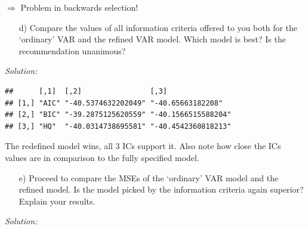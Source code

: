 \documentclass[12pt,a4paper]{article}
\newenvironment{Shaded}{\begin{snugshade}}{\end{snugshade}}
\newcommand{\CommentTok}[1]{\textcolor[rgb]{0.56,0.35,0.01}{\textit{#1}}}
\newcommand{\FloatTok}[1]{\textcolor[rgb]{0.00,0.00,0.81}{#1}}
\newcommand{\KeywordTok}[1]{\textcolor[rgb]{0.13,0.29,0.53}{\textbf{#1}}}
\newcommand{\NormalTok}[1]{#1}
\newcommand{\OperatorTok}[1]{\textcolor[rgb]{0.81,0.36,0.00}{\textbf{#1}}}
\newcommand{\StringTok}[1]{\textcolor[rgb]{0.31,0.60,0.02}{#1}}
\begin{document}
\(\Rightarrow\) Problem in backwards selection!

\begin{itemize}
  \item[d)]  Compare the values of all information criteria offered to you both for the ‘ordinary’ VAR and the refined VAR model. Which model is best? Is the recommendation unanimous?
\end{itemize}

\emph{Solution:}

\begin{Shaded}
\end{Shaded}

\begin{verbatim}
##      [,1]  [,2]                [,3]               
## [1,] "AIC" "-40.5374632202049" "-40.65663182208"  
## [2,] "BIC" "-39.2875125620559" "-40.1566515588204"
## [3,] "HQ"  "-40.0314738695581" "-40.4542360818213"
\end{verbatim}

The redefined model wins, all 3 ICs support it. Also note how close the
ICs values are in comparison to the fully specified model.

\begin{itemize}
  \item[e)] Proceed to compare the MSEs of the ‘ordinary’ VAR model and the refined model. Is the model picked by the information criteria again superior? Explain your results.
\end{itemize}

\emph{Solution:}

\begin{Shaded}
\end{Shaded}
\end{document}
